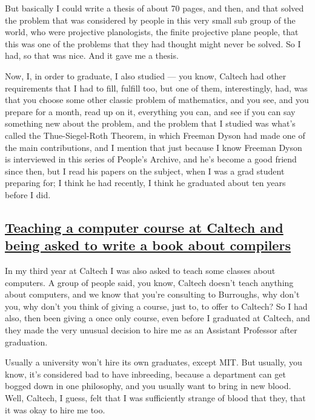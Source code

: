 \documentclass[]{article}
\begin{document}
But basically I could write a thesis of about 70 pages, and then, and
that solved the problem that was considered by people in this very small
sub group of the world, who were projective planologists, the finite
projective plane people, that this was one of the problems that they had
thought might never be solved. So I had, so that was nice. And it gave
me a thesis.

Now, I, in order to graduate, I also studied --- you know, Caltech had
other requirements that I had to fill, fulfill too, but one of them,
interestingly, had, was that you choose some other classic problem of
mathematics, and you see, and you prepare for a month, read up on it,
everything you can, and see if you can say something new about the
problem, and the problem that I studied was what's called the
Thue-Siegel-Roth Theorem, in which Freeman Dyson had made one of the
main contributions, and I mention that just because I know Freeman Dyson
is interviewed in this series of People's Archive, and he's become a
good friend since then, but I read his papers on the subject, when I was
a grad student preparing for; I think he had recently, I think he
graduated about ten years before I did.

\subsection{\texorpdfstring{\href{http://webofstories.com/play/17092}{Teaching
a computer course at Caltech and being asked to write a book about
compilers}}{Teaching a computer course at Caltech and being asked to write a book about compilers}}\label{teaching-a-computer-course-at-caltech-and-being-asked-to-write-a-book-about-compilers}

In my third year at Caltech I was also asked to teach some classes about
computers. A group of people said, you know, Caltech doesn't teach
anything about computers, and we know that you're consulting to
Burroughs, why don't you, why don't you think of giving a course, just
to, to offer to Caltech? So I had also, then been giving a once only
course, even before I graduated at Caltech, and they made the very
unusual decision to hire me as an Assistant Professor after graduation.

Usually a university won't hire its own graduates, except MIT. But
usually, you know, it's considered bad to have inbreeding, because a
department can get bogged down in one philosophy, and you usually want
to bring in new blood. Well, Caltech, I guess, felt that I was
sufficiently strange of blood that they, that it was okay to hire me
too.
\end{document}
